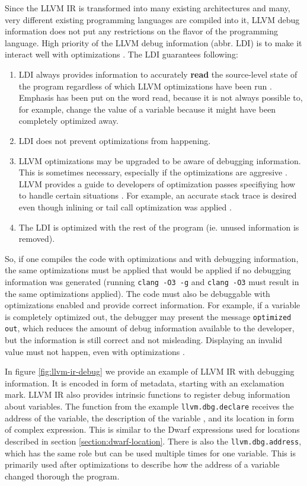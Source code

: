 Since the LLVM IR is transformed into many existing architectures and many,
very different existing programming languages are compiled into it, LLVM debug
information does not put any restrictions on the flavor of the programming
language. High priority of the LLVM debug information (abbr. LDI) is to make it
interact well with optimizations \cite{llvm-debug-info}. The LDI guarantees
following:
\begin{enumerate}
    \item LDI always provides information to accurately \textbf{read} the
        source-level state of the program regardless of which LLVM
        optimizations have been run \cite{llvm-debug-info}. Emphasis has been
        put on the word read, because it is not always possible to, for
        example, change the value of a variable because it might have been
        completely optimized away.
    \item LDI does not prevent optimizations from happening.
    \item LLVM optimizations may be upgraded to be aware of debugging
        information. This is sometimes necessary, especially if the
        optimizations are aggresive \cite{llvm-debug-info}. LLVM provides a
        guide to developers of optimization passes specifiying how to handle
        certain situations \cite{llvm-debug-optimizations}. For example,
        an accurate stack trace is desired even though inlining or tail call
        optimization was applied \cite{llvm-debug-info}.
    \item The LDI is optimized with the rest of the program (ie. unused
        information is removed).
\end{enumerate}
So, if one compiles the code with optimizations and with debugging information,
the same optimizations must be applied that would be applied if no debugging
information was generated (running \texttt{clang -O3 -g} and \texttt{clang -O3}
must result in the same optimizations applied). The code must also be
debuggable with optimizations enabled and provide correct information. For
example, if a variable is completely optimized out, the debugger may present
the message \texttt{optimized out}, which reduces the amount of debug
information available to the developer, but the information is still correct
and not misleading. Displaying an invalid value must not happen, even with
optimizations \cite{llvm-debug-info}.

In figure \ref{fig:llvm-ir-debug} we provide an example of LLVM IR with
debugging information. It is encoded in form of metadata, starting with an
exclamation mark. LLVM IR also provides intrinsic functions to register debug
information about variables. The function from the example
\texttt{llvm.dbg.declare} receives the address of the variable, the description
of the variable , and its location in form of complex expression. This is
similar to the Dwarf expressions used for locations described in section
\ref{section:dwarf-location}. There is also the \texttt{llvm.dbg.address},
which has the same role but can be used multiple times for one variable. This
is primarily used after optimizations to describe how the address of a variable
changed thorough the program.

